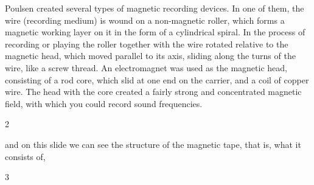 \documentclass[a4paper,14pt]{extreport}
\begin{document}
  \begin{figure}[h]
  \end{figure}
Poulsen created several types of magnetic recording devices. In one of them, the wire (recording medium) is wound on a non-magnetic roller, which forms a magnetic working layer on it in the form of a cylindrical spiral. In the process of recording or playing the roller together with the wire
  rotated relative to the magnetic head, which moved parallel to its axis, sliding along the turns of the wire, like a screw thread. An electromagnet was used as the magnetic head, consisting of a rod core, which slid at one end on the carrier, and a coil of copper wire. The head with the core created a fairly strong and concentrated magnetic field, with which you could record sound frequencies. \par

\noindent{\color{blue} \rule{\linewidth}{0.7mm}}
\begin{center}2\end{center}
\noindent{\color{blue} \rule{\linewidth}{0.7mm}}
and on this slide we can see the structure of the magnetic tape, that is, what it consists of,
  \noindent{\color{blue} \rule{\linewidth}{0.7mm}}
  \begin{center}3\end{center}
  \noindent{\color{blue} \rule{\linewidth}{0.7mm}}
\end{document}
